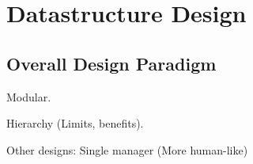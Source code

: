 \chapter{Datastructure Design}

\section{Overall Design Paradigm}

Modular.

Hierarchy (Limits, benefits).

Other designs: Single manager (More human-like)